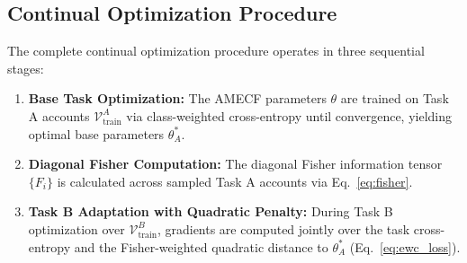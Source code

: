 \subsection{Continual Optimization Procedure}
The complete continual optimization procedure operates in three sequential stages:
\begin{enumerate}
    \item \textbf{Base Task Optimization:} The AMECF parameters $\theta$ are trained on Task A accounts $\mathcal{V}_{\text{train}}^A$ via class-weighted cross-entropy until convergence, yielding optimal base parameters $\theta_A^*$.
    \item \textbf{Diagonal Fisher Computation:} The diagonal Fisher information tensor $\{F_i\}$ is calculated across sampled Task A accounts via Eq.~\eqref{eq:fisher}.
    \item \textbf{Task B Adaptation with Quadratic Penalty:} During Task B optimization over $\mathcal{V}_{\text{train}}^B$, gradients are computed jointly over the task cross-entropy and the Fisher-weighted quadratic distance to $\theta_A^*$ (Eq.~\eqref{eq:ewc_loss}).
\end{enumerate}
